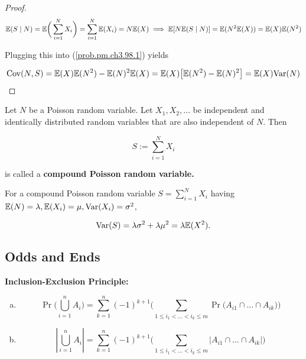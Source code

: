 \begin{theorem}
\begin{proof}
\[
\mathbb{E}(S \mid N) = \mathbb{E} \bigg( \sum_{i=1}^N X_i \bigg) = \sum_{i=1}^N \mathbb{E}(X_i) = N \mathbb{E}(X) \implies \mathbb{E}[ N\mathbb{E}(S \mid N)] = \mathbb{E}(N^2 \mathbb{E}(X)) = \mathbb{E}(X) \mathbb{E}(N^2)
\]

Plugging this into (\ref{prob.pm.ch3.98.1}) yields

\[
\mathrm{Cov}(N, S) =  \mathbb{E}(X) \mathbb{E}(N^2)- \mathbb{E}(N)^2 \mathbb{E}(X)  = \mathbb{E}(X) \big[ \mathbb{E}(N^2) - \mathbb{E}(N)^2 \big] =  \mathbb{E}(X) \mathrm{Var}(N)
\]

\end{proof}

\begin{definition}Let \(N\) be a Poisson random variable. Let \(X_1, X_2, \ldots \) be independent and identically distributed random variables that are also independent of \(N\). Then

\[
S := \sum_{i=1}^N X_i
\]

is called a \textbf{compound Poisson random variable.}
\end{definition}

\begin{proposition}For a compound Poisson random variable \(S = \sum_{i=1}^N X_i\) having \(\mathbb{E}(N) = \lambda, \mathbb{E}(X_i) = \mu, \mathrm{Var}(X_i) = \sigma^2\), 

\[
\mathrm{Var}(S) = \lambda \sigma^2 + \lambda \mu^2 = \lambda \mathbb{E}(X^2).
\]

\end{proposition}

\subsection{Odds and Ends}

\begin{proposition} \label{prob.inex} \textbf{Inclusion-Exclusion Principle:}
\begin{enumerate}[(a)]

\item \[
\Pr \bigg( \bigcup_{i=1}^n A_i \bigg) = \sum_{k=1}^n (-1)^{k+1} \bigg( \sum_{1 \leq i_1 < \ldots < i_k \leq m} \Pr \big(A_{i1} \cap \ldots \cap A_{ik} \big) \bigg)
\]

\item \[
\left| \bigcup_{i=1}^n A_i \right| = \sum_{k=1}^n (-1)^{k+1} \bigg( \sum_{1 \leq i_1 < \ldots < i_k \leq m} \left| A_{i1} \cap \ldots \cap A_{ik} \right| \bigg)
\]
\end{enumerate}


\end{proposition}
\end{theorem}
